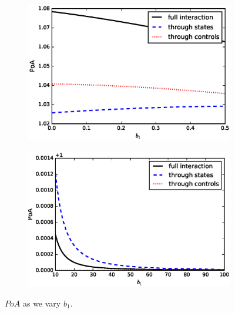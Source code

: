 \documentclass[11pt]{article}
\begin{document}
\begin{figure}[!htb]
	\centering
	\begin{subfigure}{.45\textwidth}
		\includegraphics[scale=0.5]{PoA_final_b1_0.eps}
	\end{subfigure}
	\begin{subfigure}{.45\textwidth}
		\includegraphics[scale=0.5]{PoA_final_b1_large.eps}
	\end{subfigure}
	\caption{$PoA$ as we vary $b_1$.}
	\label{fig:b1}
\end{figure}
\end{document}
